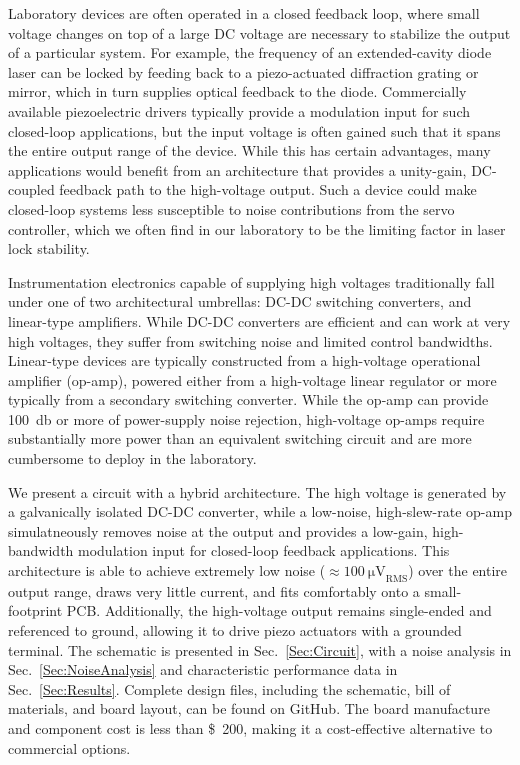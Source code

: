 \documentclass[aip,rsi,reprint]{revtex4-1} %
\begin{document}
Laboratory devices are often operated in a closed feedback loop, where small voltage changes on top of a large DC voltage are necessary to stabilize the output of a particular system.
For example, the frequency of an extended-cavity diode laser can be locked by feeding back to a piezo-actuated diffraction grating or mirror, which in turn supplies optical feedback to the diode.
Commercially available piezoelectric drivers typically provide a modulation input for  such closed-loop applications, but  the input voltage is often gained such that it spans the entire output range of the device.
While this has certain advantages, many applications would benefit from an architecture that provides a unity-gain, DC-coupled feedback path to the high-voltage output. 
Such a device could make closed-loop systems less susceptible to noise contributions from the servo controller, which we often find in our laboratory to be the limiting factor in laser lock stability.

Instrumentation electronics capable of supplying high voltages traditionally fall under one of two architectural umbrellas: DC-DC switching converters, and linear-type amplifiers.
While DC-DC converters are efficient and can work at very high voltages, they suffer from switching noise and limited control bandwidths.
Linear-type devices are typically constructed from a high-voltage operational amplifier (op-amp), powered either from a high-voltage linear regulator or more typically from a secondary switching converter.
While the op-amp can provide \SI{100}{\decibel} or more of power-supply noise rejection\cite{PA84Datasheet}, high-voltage op-amps require substantially more power than an equivalent switching circuit and are more cumbersome to deploy in the laboratory.

We present a circuit with a hybrid architecture.
The high voltage is generated by a galvanically isolated DC-DC converter, while a low-noise, high-slew-rate op-amp simulatneously removes noise at the output and provides a low-gain, high-bandwidth modulation input for closed-loop feedback applications.
This architecture is able to achieve extremely low noise ($\approx\SI{100}{\micro\volt}_{\text{RMS}}$) over the entire output range, draws very little current, and fits comfortably onto a small-footprint PCB.
Additionally, the high-voltage output remains single-ended and referenced to ground, allowing it to drive piezo actuators with a grounded terminal.
The schematic is presented in Sec.~\ref{Sec:Circuit}, with a noise analysis in Sec.~\ref{Sec:NoiseAnalysis} and characteristic performance data in Sec.~\ref{Sec:Results}.
Complete design files, including the schematic, bill of materials, and board layout, can be found on GitHub.\cite{PiezoDesignFiles}
The board manufacture and component cost is less than \SI{200}[\$]{}, making it a cost-effective alternative to commercial options. 
\end{document}
